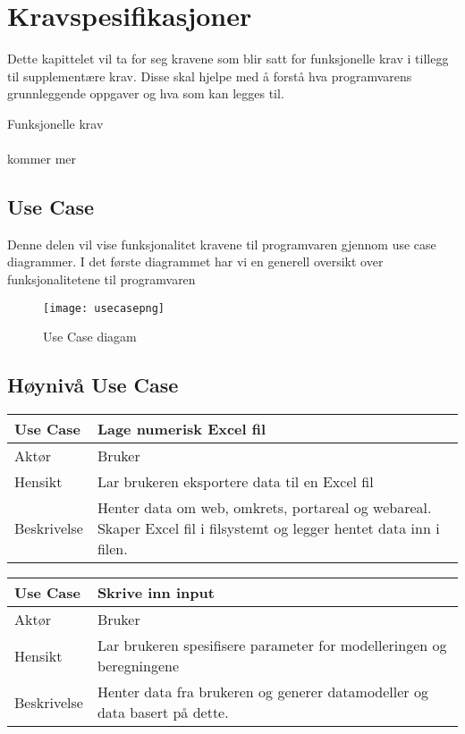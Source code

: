 \chapter{Kravspesifikasjoner}



Dette kapittelet vil ta for seg kravene som blir satt for funksjonelle krav i tillegg til supplementære krav. Disse skal hjelpe med å forstå hva programvarens grunnleggende oppgaver og hva som kan legges til.

	Funksjonelle krav \\ \\
	kommer mer









\section{Use Case}
Denne delen vil vise funksjonalitet kravene til programvaren gjennom use case diagrammer. I det første diagrammet har vi en generell oversikt over funksjonalitetene til programvaren 


\begin{figure}[h]
    \centering
    \texttt{[image: usecasepng]}
    \caption{Use Case diagam}
    \label{fig:my_label}
\end{figure}

\section{Høynivå Use Case}
\begin{center}
  \begin{tabular}{ | l | p{8cm} | }
    \hline
    Use Case & Lage numerisk Excel fil \\ \hline
    Aktør & Bruker \\ \hline
    Hensikt & Lar brukeren eksportere data til en Excel fil\\ \hline
    Beskrivelse & Henter data om web, omkrets, portareal og webareal. Skaper Excel fil i filsystemt og legger hentet data inn i filen. \\
    \hline
  \end{tabular}
\end{center}

\begin{center}
  \begin{tabular}{ | l | p{8cm} | }
    \hline
    Use Case & Skrive inn input \\ \hline
    Aktør & Bruker \\ \hline
    Hensikt & Lar brukeren spesifisere parameter for modelleringen og beregningene\\ \hline
    Beskrivelse & Henter data fra brukeren og generer datamodeller og data basert på dette. \\
    \hline
  \end{tabular}
\end{center}

